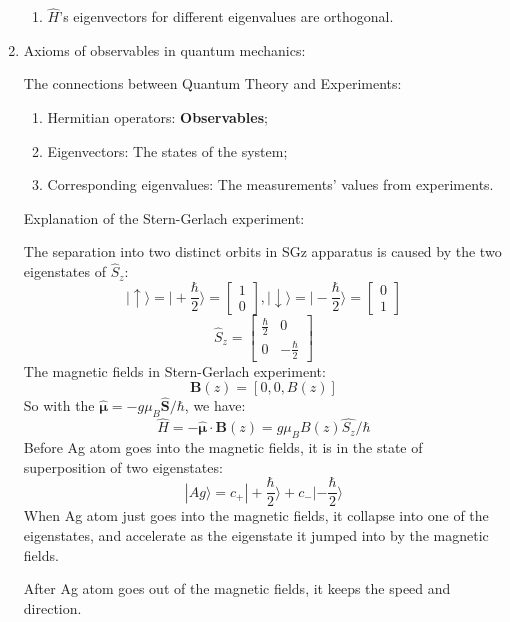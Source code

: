 \documentclass[12pt]{article}
\numberwithin{equation}{section}
\begin{document}
\begin{enumerate}
\begin{enumerate}
		\item $\hat{H}$'s eigenvectors for different eigenvalues are orthogonal.
	\end{enumerate}
\item {\color{red}Axioms of observables} in quantum mechanics: \par
	The connections between Quantum Theory and Experiments:
	\begin{enumerate}
		\item Hermitian operators: \textbf{Observables};  
		\item Eigenvectors: The states of the system;
		\item Corresponding eigenvalues: The measurements' values from experiments.
	\end{enumerate}
	Explanation of the Stern-Gerlach experiment: \par
	The separation into two distinct orbits in SGz apparatus is caused by the two eigenstates of $\hat{S}_z$:
	\begin{equation}
		|\uparrow \rangle = |+\frac{\hbar}{2}\rangle=\begin{bmatrix}1\\0\end{bmatrix},
		|\downarrow \rangle = |-\frac{\hbar}{2}\rangle=\begin{bmatrix}0\\1\end{bmatrix}
	\end{equation}
	\begin{equation}
		\hat{S}_z=\begin{bmatrix}\frac{\hbar}{2}&0\\0&-\frac{\hbar}{2}\end{bmatrix}
	\end{equation}
	The magnetic fields in Stern-Gerlach experiment:
	\begin{equation}
		\bm{B}(z)=[0,0,B(z)]
	\end{equation}
	So with the $\hat{\bm{\mu}}=-g\mu_B\hat{\bm{S}}/\hbar$, we have:
	\begin{equation}
		\hat{H}=-\hat{\bm{\mu}}\cdot\bm{B}(z)=g\mu_BB(z)\hat{S_z}/\hbar
	\end{equation}
	{\color{orange}Before Ag atom goes into the magnetic fields}, it is in the state of superposition of two eigenstates:
	\begin{equation}
		|Ag \rangle = c_+|+\frac{\hbar}{2}\rangle+ c_-|-\frac{\hbar}{2}\rangle
	\end{equation}
	{\color{orange}When Ag atom just goes into the magnetic fields}, it collapse into one of the eigenstates, and accelerate as the eigenstate it jumped into by the magnetic fields.\par
	{\color{orange}After Ag atom goes out of the magnetic fields}, it keeps the speed and direction.
\end{enumerate}
\end{document}
